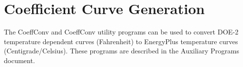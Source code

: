\section{Coefficient Curve Generation}\label{coefficient-curve-generation}

The CoeffConv and CoeffConv utility programs can be used to convert DOE-2 temperature dependent curves (Fahrenheit) to EnergyPlus temperature curves (Centigrade/Celsius). These programs are described in the Auxiliary Programs document.
